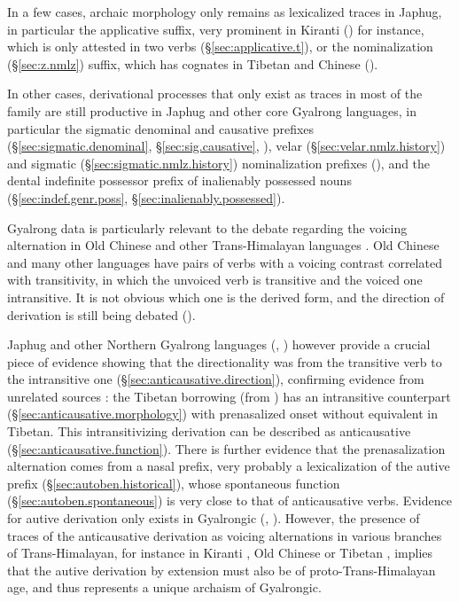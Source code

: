In a few cases, archaic morphology only remains as lexicalized traces in Japhug, in particular the applicative  suffix, very prominent in Kiranti (\citealt{michailovsky85dental, jacques15derivational.khaling}) for instance, which is only attested in two verbs (§\ref{sec:applicative.t}), or the nominalization  (§\ref{sec:z.nmlz}) suffix, which has cognates in Tibetan and Chinese (\citealt{jacques03s.houzhui, jacques16ssuffixes}).

In other cases,  derivational processes that only exist as traces in most of the family are still productive in Japhug and other core Gyalrong languages, in particular the sigmatic denominal and causative prefixes (§\ref{sec:sigmatic.denominal}, §\ref{sec:sig.causative}, \citealt{sagart12sprefix, jacques15causative}),  velar (§\ref{sec:velar.nmlz.history}) and sigmatic (§\ref{sec:sigmatic.nmlz.history}) nominalization prefixes (\citealt{jacques14snom, konnerth16gV, jacques19fossil}), and the dental indefinite possessor prefix of inalienably possessed nouns (§\ref{sec:indef.genr.poss}, §\ref{sec:inalienably.possessed}).

Gyalrong data is particularly relevant to the debate regarding the voicing alternation in Old Chinese and other Trans-Himalayan languages
\citep{handel12valence}. Old Chinese and many other languages have pairs of verbs with a voicing contrast correlated with transitivity, in which the unvoiced verb is transitive and the voiced one intransitive. It is not obvious which one is the derived form, and the direction of derivation is still being debated (\citealt{sagart12sprefix, mei12caus}). 

Japhug and other Northern Gyalrong languages  (\citealt[411--412]{jacques04these}, \citealt[271]{gong18these}) however provide a crucial piece of evidence showing that the directionality was from the transitive verb to the intransitive one (§\ref{sec:anticausative.direction}), confirming evidence from unrelated sources \citep{sagart03prenasalized}: the Tibetan borrowing  (from ) has an intransitive counterpart  (§\ref{sec:anticausative.morphology}) with prenasalized onset without equivalent in Tibetan. This intransitivizing derivation can be described as anticausative (§\ref{sec:anticausative.function}). There is further evidence that the prenasalization alternation comes from a nasal prefix, very probably a lexicalization of the   autive  prefix (§\ref{sec:autoben.historical}), whose spontaneous function (§\ref{sec:autoben.spontaneous}) is very close to that of anticausative verbs. Evidence for autive derivation only exists in Gyalrongic (\citealt[357--368]{lai17khroskyabs}, \citealt{gong18these}). However, the presence of traces of the anticausative derivation as voicing alternations in various branches of Trans-Himalayan, for instance in Kiranti \citep{jacques15derivational.khaling}, Old Chinese \citep{sagart12sprefix} or Tibetan \citep{jacques12internal}, implies that the autive derivation by extension must also be of proto-Trans-Himalayan age, and thus represents a unique archaism of Gyalrongic.
 
